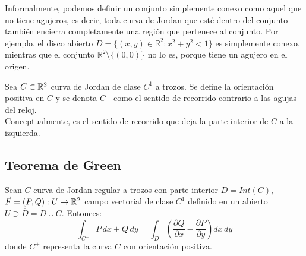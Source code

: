 Informalmente, podemos definir un conjunto simplemente conexo como aquel que no
tiene agujeros, es decir, toda curva de Jordan que esté dentro del conjunto
también encierra completamente una región que pertenece al conjunto. Por
ejemplo, el disco abierto \( D = \{(x, y) \in \mathbb{R}^2 : x^2 + y^2 < 1\} \)
es simplemente conexo, mientras que el conjunto \( \mathbb{R}^2 \setminus
\{(0,0)\} \) no lo es, porque tiene un agujero en el origen.\\

\begin{definición}
Sea $C \subset \mathbb{R}^2$ curva de Jordan de clase $C^1$ a trozos. Se define la orientación positiva en $C$ y se denota $C^+$ como el sentido de recorrido contrario a las agujas del reloj. \\
Conceptualmente, es el sentido de recorrido que deja la parte interior de $C$ a la izquierda.
\end{definición}

\subsection{Teorema de Green}

\begin{teorema}
    Sean $C$ curva de Jordan regular a trozos con parte interior $D = Int(C)$, $\vec{F} = (P, Q) : U \to \mathbb{R}^2$ campo vectorial de clase $C^1$ definido en un abierto $U \supset \overline{D} = D \cup C$. Entonces:
    $$\int_{C^+} P \, dx + Q \, dy = \int_{D} \left(\frac{\partial Q}{\partial x} - \frac{\partial P}{\partial y}\right) dx \, dy
    $$
    donde $C^+$ representa la curva $C$ con orientación positiva.
\end{teorema}

